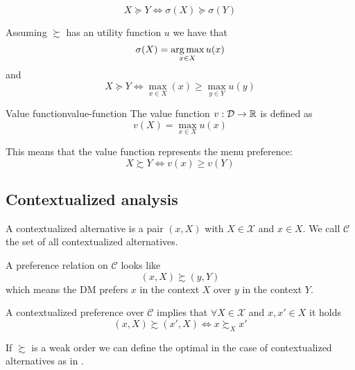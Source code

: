 \documentclass[12pt]{extarticle}
\begin{document}
\begin{corollary}{}{}
    \begin{equation}
        X \succeq Y \iff \sigma(X) \succeq \sigma(Y)
    \end{equation}
\end{corollary}

Assuming $\succsim$ has an utility function $u$ we have that
\begin{equation}
    \sigma(X) = \operatorname*{arg\,max}_{x \in X} u(x)
\end{equation}
and
\begin{equation}
    X \succeq Y \iff \max_{x \in X} (x) \geq \max_{y \in Y} u(y)
\end{equation}

\begin{definition}{Value function}{value-function}
    The value function $v: \mathcal D \to \mathbb{R}$ is defined as
    \begin{equation}
        v(X) = \max_{x \in X} u(x)
    \end{equation}
\end{definition}

This means that the value function represents the menu preference:
\begin{equation}
    X \succsim Y \iff v(x) \geq v(Y)
\end{equation}

\subsection{Contextualized analysis}

A contextualized alternative is a pair $(x, X)$ with $X \in \mathcal X$ and $x \in X$.
We call $\mathcal C$ the set of all contextualized alternatives.

A preference relation on $\mathcal C$ looks like
\begin{equation}
    (x, X) \succsim (y, Y)
\end{equation}
which means the DM prefers $x$ in the context $X$ over $y$ in the context $Y$.

A contextualized preference over $\mathcal C$ implies that $\forall X \in \mathcal X$ and $x, x' \in X$ it holds
\begin{equation}
    (x, X) \succsim (x', X) \iff x \succsim_X x'
\end{equation}

If $\succsim$ is a weak order we can define the optimal in the case of contextualized alternatives as in .
\end{document}
